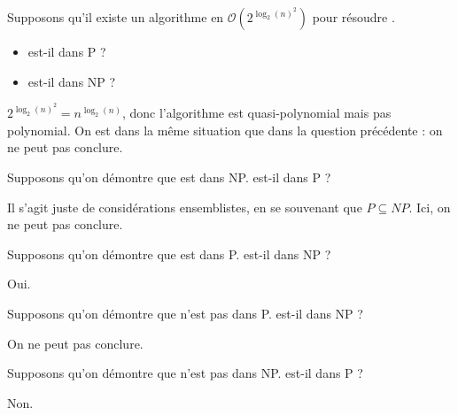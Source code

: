 \begin{exercice}[Appartenance à P/NP]
  \begin{questions}
  \item Supposons qu'il existe un algorithme en $\mathcal{O}\left(2^{\log_2(n)^2} \right)$ pour résoudre \PROBLEM.
    \begin{itemize}
    \item \PROBLEM{} est-il dans P ?
    \item \PROBLEM{} est-il dans NP ?
    \end{itemize}
  \end{questions}
  \begin{corrections}
    $2^{\log_2(n)^2} = n^{\log_2(n)}$, donc l'algorithme est quasi-polynomial mais pas polynomial. 
    On est dans la même situation que dans la question précédente : on ne peut pas conclure.
  \end{corrections}
  
  \begin{questions}
  \item Supposons qu'on démontre que \PROBLEM{} est dans NP. \PROBLEM{} est-il dans P ?
  \end{questions}
  \begin{corrections}
    Il s'agit juste de considérations ensemblistes, en se souvenant que $P \subseteq NP$.
    Ici, on ne peut pas conclure.
  \end{corrections}

  \begin{questions}
  \item Supposons qu'on démontre que \PROBLEM{} est dans P. \PROBLEM{} est-il dans NP ?
  \end{questions}
  \begin{corrections}
    Oui.
  \end{corrections}

  \begin{questions}
  \item Supposons qu'on démontre que \PROBLEM{} n'est pas dans P. \PROBLEM{} est-il dans NP ?
  \end{questions}
  \begin{corrections}
    On ne peut pas conclure.
  \end{corrections}

  \begin{questions}
  \item Supposons qu'on démontre que \PROBLEM{} n'est pas dans NP. \PROBLEM{} est-il dans P ?
  \end{questions}
  \begin{corrections}
    Non.
  \end{corrections}


\end{exercice}
